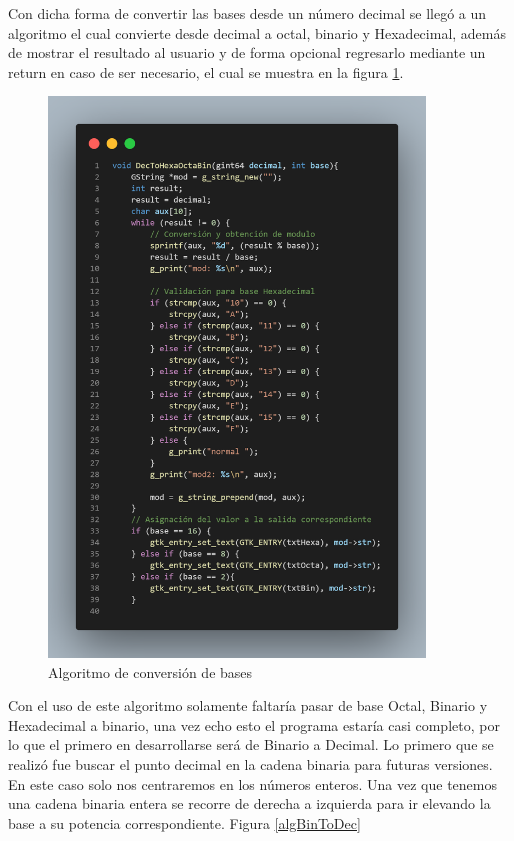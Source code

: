 \documentclass[letterpaper,12pt]{extarticle}%
\begin{document}
\begin{multicols}{2}
		Con dicha forma de convertir las bases desde un número decimal se llegó a un algoritmo el cual
		convierte desde decimal a octal, binario y Hexadecimal, además de mostrar el resultado al usuario
		y de forma opcional regresarlo mediante un return en caso de ser necesario, el cual se muestra en la 
		figura \ref{algDecToRest}.

		\begin{figure}[H]
			\begin{center}
			\includegraphics[width=10cm]{imag//algDecToRest.png}
			\caption{Algoritmo de conversión de bases}
			\label{algDecToRest}
			\end{center}
			\end{figure}

			Con  el uso de este algoritmo solamente faltaría pasar de base Octal,
			Binario y Hexadecimal a binario, una vez echo esto el programa estaría
			casi completo, por lo que el primero en desarrollarse será de Binario a 
			Decimal. Lo primero que se realizó fue buscar el punto decimal en la 
			cadena binaria para futuras versiones. En este caso solo nos centraremos
			en los números enteros. Una vez que tenemos una cadena binaria entera
			se recorre de derecha a izquierda para ir elevando la base a su potencia 
			correspondiente. Figura \ref{algBinToDec} 
			

\end{multicols}
\end{document}
